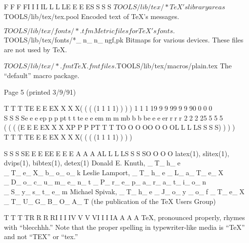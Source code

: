      FFFFIIIILLLLEEEESSSS
          $TOOLS/lib/tex/*    TeX's library areas

          $TOOLS/lib/tex/tex.pool
                              Encoded text of TeX's messages.

          $TOOLS/lib/tex/fonts/*.tfm
                              Metric files for TeX's fonts.

          $TOOLS/lib/tex/fonts/*_n_n_n{gf,pk}
                              Bitmaps for various devices.  These
                              files are not used by TeX.

          $TOOLS/lib/tex/*.fmt
                              TeX .fmt files.

          $TOOLS/lib/tex/macros/plain.tex
                              The ``default'' macro package.




     Page 5                                           (printed 3/9/91)






     TTTTEEEEXXXX((((1111))))            1111999999990000 SSSSeeeepppptttteeeemmmmbbbbeeeerrrr 22225555 ((((EEEEXXXXPPPPTTTTOOOOOOOOLLLLSSSS))))             TTTTEEEEXXXX((((1111))))



     SSSSEEEEEEEE AAAALLLLSSSSOOOO
          latex(1), slitex(1), dvips(1), bibtex(1), detex(1)
          Donald E. Knuth, _T_h_e _T_e_X_b_o_o_k
          Leslie Lamport, _T_h_e _L_a_T_e_X _D_o_c_u_m_e_n_t _P_r_e_p_a_r_a_t_i_o_n _S_y_s_t_e_m
          Michael Spivak, _T_h_e _J_o_y _o_f _T_e_X
          _T_U_G_B_O_A_T (the publication of the TeX Users Group)

     TTTTRRRRIIIIVVVVIIIIAAAA
          TeX, pronounced properly, rhymes with ``blecchhh.''  Note
          that the proper spelling in typewriter-like media is ``TeX''
          and not ``TEX'' or ``tex.''

